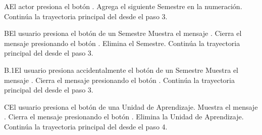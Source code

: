 \begin{comment}
\begin{UCtrayectoriaA}{A}{El sistema no encuentra ningún formulario para mostrar.}
	\UCpaso No encuentra ningún formulario para mostrar.
    \UCpaso El sistema muestra el mensaje \MSGref{MSG6}{Por el momento no se puede registrar la bibliografía}.
    \UCpaso[\UCactor] Cierra el mensaje presionando el botón \IUbutton{Aceptar}.
    \UCpaso Continua en el paso 1 de la trayectoria principal del \UCref{CU1}.
\end{UCtrayectoriaA}
\end{comment}
\begin{UCtrayectoriaA}{A}{El actor presiona el botón \IUbutton{+}.}
	\UCpaso Agrega el siguiente Semestre en la numeración.
    \UCpaso Continúa la trayectoria principal del  desde el paso 3.
\end{UCtrayectoriaA}
\begin{UCtrayectoriaA}{B}{El usuario presiona el botón  de un Semestre}
	\UCpaso  Muestra el mensaje .
	\UCpaso[\UCactor] Cierra el mensaje presionando el botón .
	\UCpaso Elimina el Semestre.
    \UCpaso Continúa la trayectoria principal del  desde el paso 3.
\end{UCtrayectoriaA}
\begin{UCtrayectoriaA}{B.1}{El usuario presiona accidentalmente el botón  de un Semestre}
	\UCpaso  Muestra el mensaje .
	\UCpaso[\UCactor] Cierra el mensaje presionando el botón .
    \UCpaso Continúa la trayectoria principal del  desde el paso 3.
\end{UCtrayectoriaA}
\begin{UCtrayectoriaA}{C}{El usuario presiona el botón  de una Unidad de Aprendizaje.}
	\UCpaso  Muestra el mensaje .
	\UCpaso[\UCactor] Cierra el mensaje presionando el botón .
	\UCpaso Elimina la Unidad de Aprendizaje.
    \UCpaso Continúa la trayectoria principal del  desde el paso 4.
\end{UCtrayectoriaA}

